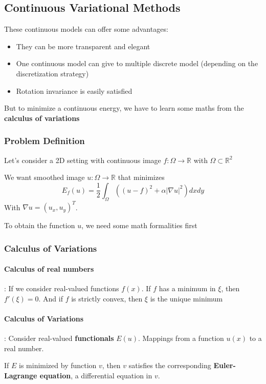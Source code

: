 \documentclass{article}
\begin{document}
\subsection{Continuous Variational Methods}
These continuous models can offer some advantages:
\begin{itemize}
  \item They can be more transparent and elegant
  \item One continuous model can give to multiple discrete model (depending on the discretization strategy)
  \item Rotation invariance is easily satisfied 
\end{itemize}
But to minimize a continuous energy, we have to learn some maths from the \textbf{calculus of variations}

\subsubsection{Problem Definition}
Let's consider a 2D setting with continuous image $f:\Omega \to \mathbb{R}$ with $\Omega \subset \mathbb{R}^2$

We want smoothed image $u:\Omega \to \mathbb{R}$ that minimizes
\[E_f(u) = \frac{1}{2}\int_\Omega \left((u-f)^2 + \alpha |\nabla u|^2\right) dx dy\]
With $\nabla u = (u_x,u_y)^T$. 


To obtain the function $u$, we need some math formalities first

\subsubsection{Calculus of Variations}
\paragraph{Calculus of real numbers}: If we consider real-valued functions $f(x)$. If $f$ has a minimum in $\xi$, then $f'(\xi) = 0$. And if $f$ is strictly convex, then $\xi$ is the unique minimum

\paragraph{Calculus of Variations}: Consider real-valued \textbf{functionals} $E(u)$. Mappings from a function $u(x)$ to a real number.

If $E$ is minimized by function $v$, then $v$ satisfies the corresponding \textbf{Euler-Lagrange equation}, a differential equation in $v$.
\end{document}
